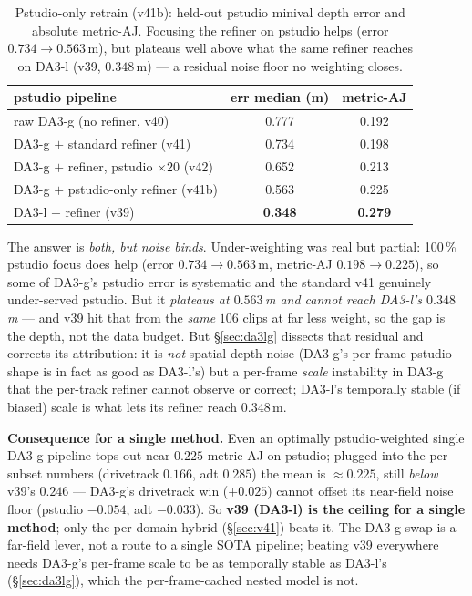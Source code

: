 \documentclass[11pt,a4paper]{article}
\begin{document}
\begin{table}[h]
\centering
\caption{Pstudio-only retrain (v41b): held-out pstudio minival depth error and absolute metric-AJ.
Focusing the refiner on pstudio helps (error $0.734\!\to\!0.563$\,m), but plateaus well above what the same
refiner reaches on DA3-l (v39, $0.348$\,m) --- a residual noise floor no weighting closes.}
\label{tab:v41b}
\begin{tabular}{lcc}
\toprule
pstudio pipeline & err median (m) & metric-AJ \\
\midrule
raw DA3-g (no refiner, v40)          & 0.777 & 0.192 \\
DA3-g $+$ standard refiner (v41)     & 0.734 & 0.198 \\
DA3-g $+$ refiner, pstudio $\times20$ (v42) & 0.652 & 0.213 \\
DA3-g $+$ pstudio-only refiner (v41b) & 0.563 & 0.225 \\
DA3-l $+$ refiner (v39)              & \textbf{0.348} & \textbf{0.279} \\
\bottomrule
\end{tabular}
\end{table}

The answer is \emph{both, but noise binds}. Under-weighting was real but partial: 100\,\% pstudio focus does
help (error $0.734\!\to\!0.563$\,m, metric-AJ $0.198\!\to\!0.225$), so some of DA3-g's pstudio error is
systematic and the standard v41 genuinely under-served pstudio. But it \emph{plateaus at $0.563$\,m and
cannot reach DA3-l's $0.348$\,m} --- and v39 hit that from the \emph{same} $106$ clips at far less weight,
so the gap is the depth, not the data budget. But \S\ref{sec:da3lg} dissects that residual and corrects its
attribution: it is \emph{not} spatial depth noise (DA3-g's per-frame pstudio shape is in fact as good as
DA3-l's) but a per-frame \emph{scale} instability in DA3-g that the per-track refiner cannot observe or
correct; DA3-l's temporally stable (if biased) scale is what lets its refiner reach $0.348$\,m.

\textbf{Consequence for a single method.} Even an optimally pstudio-weighted single DA3-g pipeline tops out
near $0.225$ metric-AJ on pstudio; plugged into the per-subset numbers (drivetrack $0.166$, adt $0.285$)
the mean is ${\approx}0.225$, still \emph{below} v39's $0.246$ --- DA3-g's drivetrack win ($+0.025$) cannot
offset its near-field noise floor (pstudio $-0.054$, adt $-0.033$). So \textbf{v39 (DA3-l) is the ceiling
for a single method}; only the per-domain hybrid (\S\ref{sec:v41}) beats it. The DA3-g swap is a far-field
lever, not a route to a single SOTA pipeline; beating v39 everywhere needs DA3-g's per-frame scale to be as
temporally stable as DA3-l's (\S\ref{sec:da3lg}), which the per-frame-cached nested model is not.
\end{document}
